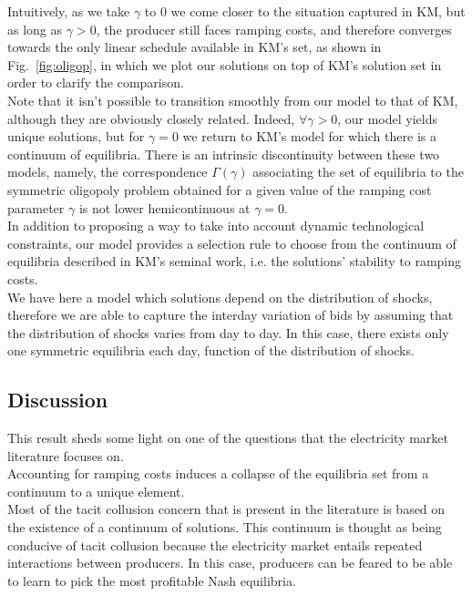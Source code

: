 Intuitively, as we take $\gamma$ to $0$ we come closer to the situation captured in KM, but as long as $\gamma>0$, the producer still faces ramping costs, and therefore converges towards the only linear schedule available in KM's set, as shown in Fig.~\ref{fig:oligop}, in which we plot our solutions on top of KM's solution set in order to clarify the comparison. \\

Note that it isn't possible to transition smoothly from our model to that of KM, although they are obviously closely related. Indeed, $\forall \gamma>0$, our model yields unique solutions, but for $\gamma=0$ we return to KM's model for which there is a continuum of equilibria. There is an intrinsic discontinuity between these two models, namely, the correspondence $\Gamma(\gamma)$ associating the set of equilibria to the symmetric oligopoly problem obtained for a given value of the ramping cost parameter $\gamma$ is not lower hemicontinuous at $\gamma=0$. \\

In addition to proposing a way to take into account dynamic technological constraints, our model provides a selection rule to choose from the continuum of equilibria described in KM's seminal work, i.e. the solutions' stability to ramping costs.\\

We have here a model which solutions depend on the distribution of shocks, therefore we are able to capture the interday variation of bids by assuming that the distribution of shocks varies from day to day. In this case, there exists only one symmetric equilibria each day, function of the distribution of shocks.\\

\subsection{Discussion}

This result sheds some light on one of the questions that the electricity market literature focuses on. \\

Accounting for ramping costs induces a collapse of the equilibria set from a continuum to a unique element. \\

Most of the tacit collusion concern that is present in the literature is based on the existence of a continuum of solutions. This continuum is thought as being conducive of tacit collusion because the electricity market entails repeated interactions between producers. In this case, producers can be feared to be able to learn to pick the most profitable Nash equilibria. \\

